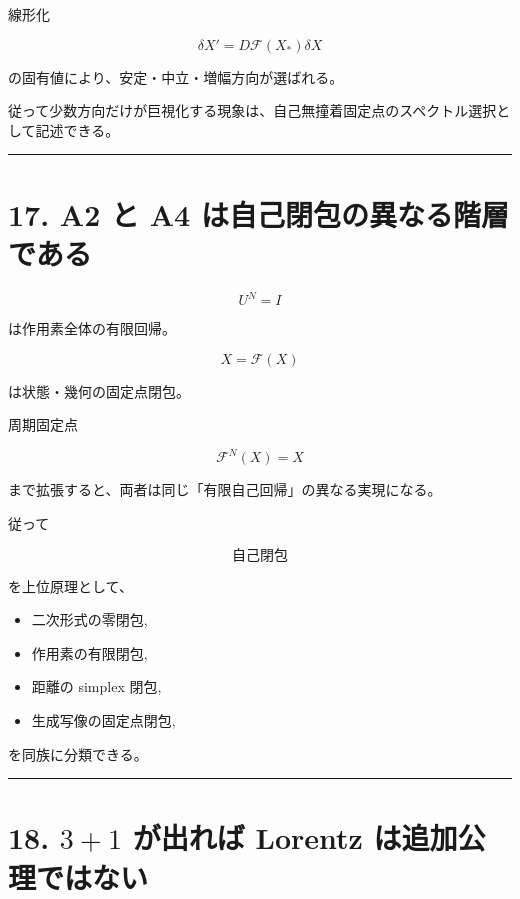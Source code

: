 \documentclass[
  a4paper,
]{ltjsarticle}
\providecommand{\tightlist}{%
  \setlength{\itemsep}{0pt}\setlength{\parskip}{0pt}}
\begin{document}
線形化

\[
\delta X'
=
D\mathcal F(X_*)\delta X
\]

の固有値により、安定・中立・増幅方向が選ばれる。

従って少数方向だけが巨視化する現象は、自己無撞着固定点のスペクトル選択として記述できる。

\begin{center}\rule{0.5\linewidth}{0.5pt}\end{center}

\section{17. A2 と A4
は自己閉包の異なる階層である}\label{a2-ux3068-a4-ux306fux81eaux5df1ux9589ux5305ux306eux7570ux306aux308bux968eux5c64ux3067ux3042ux308b}

\[
U^N=I
\]

は作用素全体の有限回帰。

\[
X=\mathcal F(X)
\]

は状態・幾何の固定点閉包。

周期固定点

\[
\mathcal F^N(X)=X
\]

まで拡張すると、両者は同じ「有限自己回帰」の異なる実現になる。

従って

\[
\boxed{
\text{自己閉包}
}
\]

を上位原理として、

\begin{itemize}
\tightlist
\item
  二次形式の零閉包,
\item
  作用素の有限閉包,
\item
  距離の simplex 閉包,
\item
  生成写像の固定点閉包,
\end{itemize}

を同族に分類できる。

\begin{center}\rule{0.5\linewidth}{0.5pt}\end{center}

\section{\texorpdfstring{18. \(3+1\) が出れば Lorentz
は追加公理ではない}{18. 3+1 が出れば Lorentz は追加公理ではない}}\label{ux304cux51faux308cux3070-lorentz-ux306fux8ffdux52a0ux516cux7406ux3067ux306fux306aux3044}
\end{document}
